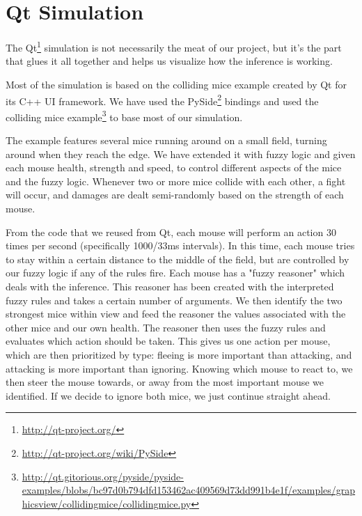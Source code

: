 \section{Qt Simulation}\label{qt simulation}
The Qt\footnote{\url{http://qt-project.org/}} simulation is not necessarily the
meat of our project, but it's the part that glues it all together and helps us
visualize how the inference is working.

Most of the simulation is based on the colliding mice example created by Qt
for its C++ UI framework. We have used the PySide\footnote{\url{http://qt-project.org/wiki/PySide}}
bindings and used the colliding mice example\footnote{\url{http://qt.gitorious.org/pyside/pyside-examples/blobs/bc97d0b794dfd153462ac409569d73dd991b4e1f/examples/graphicsview/collidingmice/collidingmice.py}}
to base most of our simulation.

The example features several mice running around on a small field, turning around when they
reach the edge. We have extended it with fuzzy logic and given each mouse health, strength and speed,
to control different aspects of the mice and the fuzzy logic. Whenever two or more mice collide with each
other, a fight will occur, and damages are dealt semi-randomly based on the strength of each mouse.

From the code that we reused from Qt, each mouse will perform an action 30 times per
second (specifically 1000/33ms intervals). In this time, each mouse tries to stay within
a certain distance to the middle of the field, but are controlled by our fuzzy logic if any of the rules fire.
Each mouse has a "fuzzy reasoner" which deals with the inference. This reasoner has been created
with the interpreted fuzzy rules and takes a certain number of arguments. We then
identify the two strongest mice within view and feed the reasoner the values associated
with the other mice and our own health. The reasoner then uses the fuzzy rules and
evaluates which action should be taken. This gives us one action per mouse, 
which are then prioritized by type: fleeing is more important than attacking,
and attacking is more important than ignoring. Knowing which mouse to react to, we
then steer the mouse towards, or away from the most important mouse we identified.
If we decide to ignore both mice, we just continue straight ahead.

